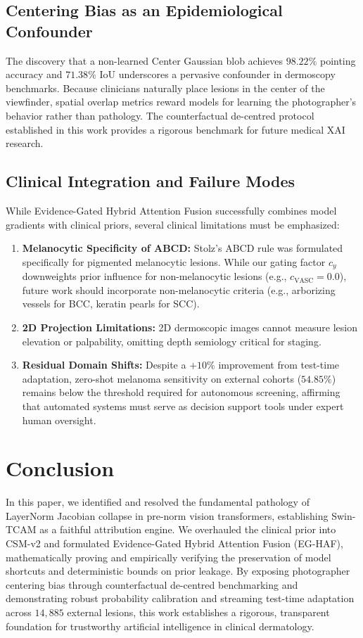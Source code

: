 \documentclass[11pt,a4paper]{article}
\begin{document}
\subsection{Centering Bias as an Epidemiological Confounder}
The discovery that a non-learned Center Gaussian blob achieves $98.22\%$ pointing accuracy and $71.38\%$ IoU underscores a pervasive confounder in dermoscopy benchmarks. Because clinicians naturally place lesions in the center of the viewfinder, spatial overlap metrics reward models for learning the photographer's behavior rather than pathology. The counterfactual de-centred protocol established in this work provides a rigorous benchmark for future medical XAI research.

\subsection{Clinical Integration and Failure Modes}
While Evidence-Gated Hybrid Attention Fusion successfully combines model gradients with clinical priors, several clinical limitations must be emphasized:
\begin{enumerate}
    \item \textbf{Melanocytic Specificity of ABCD:} Stolz's ABCD rule was formulated specifically for pigmented melanocytic lesions. While our gating factor $c_y$ downweights prior influence for non-melanocytic lesions (e.g., $c_{\text{VASC}} = 0.0$), future work should incorporate non-melanocytic criteria (e.g., arborizing vessels for BCC, keratin pearls for SCC).
    \item \textbf{2D Projection Limitations:} 2D dermoscopic images cannot measure lesion elevation or palpability, omitting depth semiology critical for staging.
    \item \textbf{Residual Domain Shifts:} Despite a $+10\%$ improvement from test-time adaptation, zero-shot melanoma sensitivity on external cohorts ($54.85\%$) remains below the threshold required for autonomous screening, affirming that automated systems must serve as decision support tools under expert human oversight.
\end{enumerate}

\section{Conclusion}
\label{sec:conclusion}
In this paper, we identified and resolved the fundamental pathology of LayerNorm Jacobian collapse in pre-norm vision transformers, establishing Swin-TCAM as a faithful attribution engine. We overhauled the clinical prior into CSM-v2 and formulated Evidence-Gated Hybrid Attention Fusion (EG-HAF), mathematically proving and empirically verifying the preservation of model shortcuts and deterministic bounds on prior leakage. By exposing photographer centering bias through counterfactual de-centred benchmarking and demonstrating robust probability calibration and streaming test-time adaptation across $14,885$ external lesions, this work establishes a rigorous, transparent foundation for trustworthy artificial intelligence in clinical dermatology.
\end{document}

